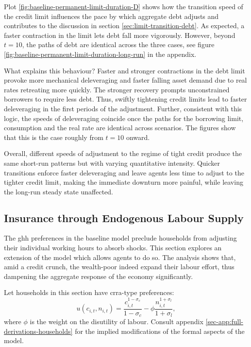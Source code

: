 \documentclass[a4paper,12pt]{article} %
\numberwithin{equation}{section} %
\numberwithin{figure}{section}
\numberwithin{table}{section}
\begin{document}
Plot \ref{fig:baseline-permanent-limit-duration-D} shows how the transition speed of the credit limit influences the pace by which aggregate debt adjusts and contributes to the discussion in section \ref{sec:limit-transition-debt}. As expected, a faster contraction in the limit lets debt fall more vigorously. However, beyond $t=10$, the paths of debt are identical across the three cases, see figure \ref{fig:baseline-permanent-limit-duration-long-run} in the appendix. 

What explains this behaviour? Faster and stronger contractions in the debt limit provoke more mechanical deleveraging and faster falling asset demand due to real rates retreating more quickly. The stronger recovery prompts unconstrained borrowers to require less debt. Thus, swiftly tightening credit limits lead to faster deleveraging in the first periods of the adjustment. Further, consistent with this logic, the speeds of deleveraging coincide once the paths for the borrowing limit, consumption and the real rate are identical across scenarios. The figures show that this is the case roughly from $t=10$ onward.

Overall, different speeds of adjustment to the regime of tight credit produce the same short-run patterns but with varying quantitative intensity. Quicker transitions enforce faster deleveraging and leave agents less time to adjust to the tighter credit limit, making the immediate downturn more painful, while leaving the long-run steady state unaffected.

\subsection{Insurance through Endogenous Labour Supply}
\label{sec:sensitivity-end-labour}

The \Gls{ghh} preferences in the baseline model preclude households from adjusting their individual working hours to absorb shocks. This section explores an extension of the model which allows agents to do so. The analysis shows that, amid a credit crunch, the wealth-poor indeed expand their labour effort, thus dampening the aggregate response of the economy significantly.

Let households in this section have \Gls{crra}-type preferences:
\begin{equation}
    u(c_{i,t}, n_{i,t}) = \frac{c_{i,t}^{1-\sigma_c}}{1-\sigma_c} - \phi \frac{n_{i,t}^{1+\sigma_l}}{1+\sigma_l}, \label{eq:hh-crra-utility}
\end{equation}
where $\phi$ is the weight on the disutility of labour. Consult appendix \ref{sec-app:full-derivations-households} for the implied modifications of the formal aspects of the model. 
\end{document}
